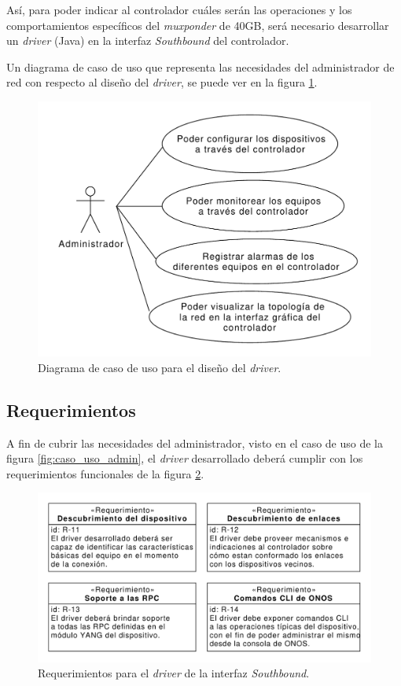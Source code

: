   Así, para poder indicar al controlador cuáles serán las operaciones y los comportamientos específicos del \textit{muxponder} de 40GB, será necesario desarrollar un \textit{driver} (Java) en la interfaz \textit{Southbound} del controlador. 

  Un diagrama de caso de uso que representa las necesidades del administrador de red con respecto al diseño del \textit{driver}, se puede ver en la figura \ref{fig:diaguso_driver}. 

  \begin{figure}[H]
    \centering
    \includegraphics[scale=0.55]{Figures/caso_uso_driver.pdf}
    \caption{Diagrama de caso de uso para el diseño del \textit{driver}.}
    \label{fig:diaguso_driver}
  \end{figure}

  \subsection{Requerimientos}
  A fin de cubrir las necesidades del administrador, visto en el caso de uso de la figura \ref{fig:caso_uso_admin}, el \textit{driver} desarrollado deberá cumplir con los requerimientos funcionales de la figura \ref{fig:req_driver}.
  
  \begin{figure}[H]
    \centering
    \includegraphics[scale=0.65]{Figures/req_driver.pdf}
    \caption{Requerimientos para el \textit{driver} de la interfaz \textit{Southbound}.}
    \label{fig:req_driver}
  \end{figure}

